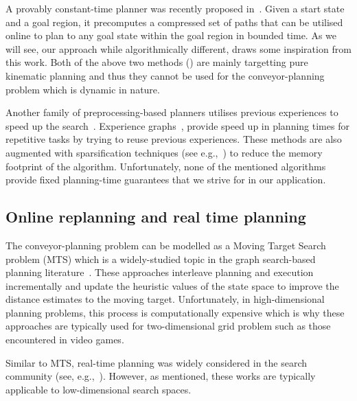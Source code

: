 \documentclass[conference]{IEEEtran}
\begin{document}
A provably constant-time planner was recently proposed in~\cite{islam2019planning}. Given a start state and a goal region, it precomputes a compressed set of paths that can be utilised online to plan to any goal state within the goal region in bounded time. As we will see, our approach while algorithmically different, draws some inspiration from this work.
%
Both of the above two methods (\cite{islam2019planning,kavraki1996probabilistic}) are mainly targetting pure kinematic planning and thus they cannot be used for the conveyor-planning problem which is dynamic in nature.
%

Another family of preprocessing-based planners utilises previous experiences to speed up the search~\cite{BAG12,CSMOC15,PCCL12}. Experience graphs~\cite{PCCL12}, provide speed up in planning times for repetitive tasks by trying to reuse previous experiences. These methods are also augmented with sparsification techniques (see e.g.,~\cite{DB14,SSAH14}) to reduce the memory footprint of the algorithm.
Unfortunately, none of the mentioned algorithms provide fixed planning-time guarantees that we strive for in our application.

\subsection{Online replanning and real time planning}
The conveyor-planning problem can be modelled as a Moving Target Search problem (MTS) which is a widely-studied topic in the graph search-based planning literature~\cite{ishida1991moving,ishida1995moving,koenig2007speeding,sun2010moving}. 
These approaches interleave planning and execution incrementally and update the heuristic values of the state space to improve the distance estimates to the moving target. Unfortunately, in high-dimensional planning problems, this process is computationally expensive which is why these approaches are typically used for two-dimensional grid problem such as those encountered in video games.

Similar to MTS, real-time planning was widely considered in the search community (see, e.g.,~\cite{KL06,KS09,korf1990real}).
However, as mentioned, these works are typically applicable to low-dimensional search spaces.
%
\end{document}
